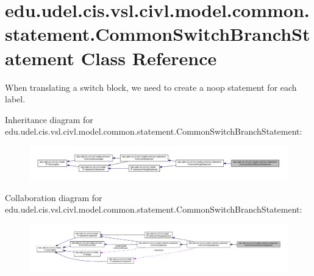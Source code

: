 \hypertarget{classedu_1_1udel_1_1cis_1_1vsl_1_1civl_1_1model_1_1common_1_1statement_1_1CommonSwitchBranchStatement}{}\section{edu.\+udel.\+cis.\+vsl.\+civl.\+model.\+common.\+statement.\+Common\+Switch\+Branch\+Statement Class Reference}
\label{classedu_1_1udel_1_1cis_1_1vsl_1_1civl_1_1model_1_1common_1_1statement_1_1CommonSwitchBranchStatement}


When translating a switch block, we need to create a noop statement for each label.  




Inheritance diagram for edu.\+udel.\+cis.\+vsl.\+civl.\+model.\+common.\+statement.\+Common\+Switch\+Branch\+Statement\+:
\nopagebreak
\begin{figure}[H]
\begin{center}
\leavevmode
\includegraphics[width=350pt]{classedu_1_1udel_1_1cis_1_1vsl_1_1civl_1_1model_1_1common_1_1statement_1_1CommonSwitchBranchStatement__inherit__graph}
\end{center}
\end{figure}


Collaboration diagram for edu.\+udel.\+cis.\+vsl.\+civl.\+model.\+common.\+statement.\+Common\+Switch\+Branch\+Statement\+:
\nopagebreak
\begin{figure}[H]
\begin{center}
\leavevmode
\includegraphics[width=350pt]{classedu_1_1udel_1_1cis_1_1vsl_1_1civl_1_1model_1_1common_1_1statement_1_1CommonSwitchBranchStatement__coll__graph}
\end{center}
\end{figure}
